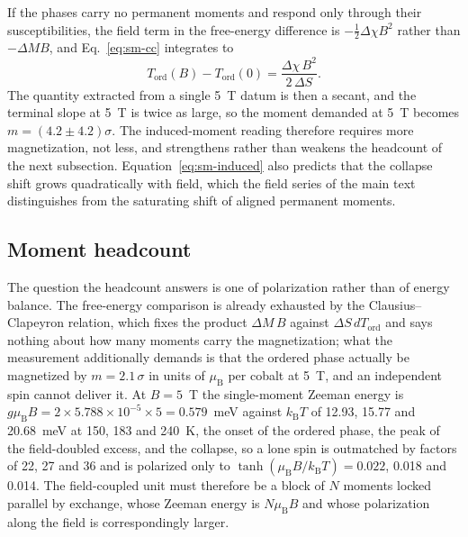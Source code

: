 \documentclass[reprint,twocolumn,prb,amsmath,amssymb,superscriptaddress,floatfix]{revtex4-2}
\newcommand{\kB}{k_{\mathrm{B}}}
\newcommand{\muBs}{\mu_{\mathrm{B}}}
\newcommand{\Tcol}{T_{\mathrm{ord}}}
\begin{document}
If the phases carry no permanent moments and respond only through their susceptibilities, the
field term in the free-energy difference is $-\tfrac12\Delta\chi B^{2}$ rather than
$-\Delta M B$, and Eq.~\eqref{eq:sm-cc} integrates to
\begin{equation}
  \Tcol(B)-\Tcol(0)=\frac{\Delta\chi\,B^{2}}{2\,\Delta S}.
  \label{eq:sm-induced}
\end{equation}
The quantity extracted from a single 5~T datum is then a secant, and the terminal slope at 5~T
is twice as large, so the moment demanded at 5~T becomes $m=(4.2\pm4.2)\sigma$. The
induced-moment reading therefore requires more magnetization, not less, and strengthens rather
than weakens the headcount of the next subsection. Equation~\eqref{eq:sm-induced} also predicts
that the collapse shift grows quadratically with field, which the field series of the main text
distinguishes from the saturating shift of aligned permanent moments.

\subsection{Moment headcount}

The question the headcount answers is one of polarization rather than of energy balance. The
free-energy comparison is already exhausted by the Clausius--Clapeyron relation, which fixes the
product $\Delta M\,B$ against $\Delta S\,d\Tcol$ and says nothing about how many moments carry
the magnetization; what the measurement additionally demands is that the ordered phase actually
be magnetized by $m=2.1\,\sigma$ in units of $\muBs$ per cobalt at 5~T, and an independent spin
cannot deliver it. At $B=5$~T the single-moment Zeeman energy is
$g\muBs B=2\times5.788\times10^{-5}\times5=0.579$~meV against $\kB T$ of 12.93, 15.77 and
20.68~meV at 150, 183 and 240~K, the onset of the ordered phase, the peak of the field-doubled
excess, and the collapse, so a lone spin is outmatched by factors of 22, 27 and 36 and is
polarized only to $\tanh(\muBs B/\kB T)=0.022$, 0.018 and 0.014. The field-coupled unit must
therefore be a block of $N$ moments locked parallel by exchange, whose Zeeman energy is
$N\muBs B$ and whose polarization along the field is correspondingly larger.
\end{document}
